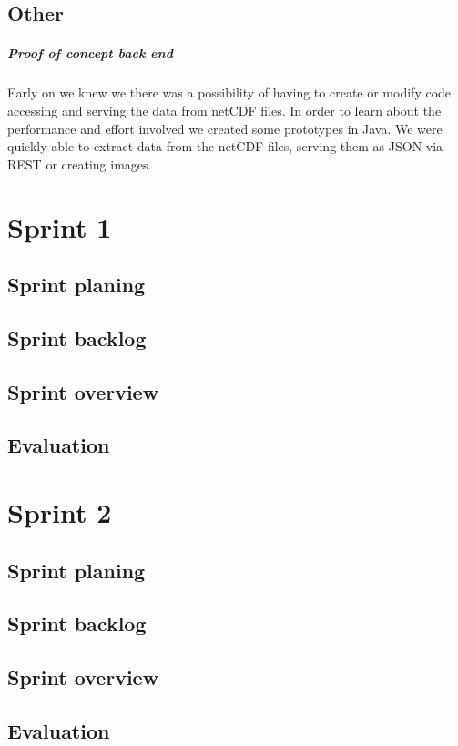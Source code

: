 \documentclass[11pt,a4paper,titlepage,oneside]{report}
\begin{document}
\section{Other}

\paragraph{Proof of concept back end}
Early on we knew we there was a possibility of having to create or modify code accessing and serving the data from netCDF files. In order to learn about the performance and effort involved we created some prototypes in Java. We were quickly able to extract data from the netCDF files, serving them as JSON via REST or creating images.


\chapter{Sprint 1}
\section{Sprint planing}
\section{Sprint backlog}
\section{Sprint overview}
\section{Evaluation}

\chapter{Sprint 2}
\section{Sprint planing}
\section{Sprint backlog}
\section{Sprint overview}
\section{Evaluation}
\end{document}

